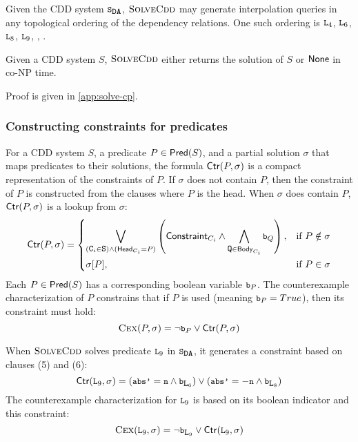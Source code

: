%
\begin{ex}
  Given the CDD system $\mcchc$, $\textsc{SolveCdd}$ may generate interpolation
  queries in any topological ordering of the dependency relations.
  One such ordering is $\cc{L}_4$, $\cc{L}_6$, $\cc{L}_8$, $\cc{L}_9$, ,
  .
\end{ex}

\begin{thm}
  \label{thm:solve-cp}
  Given a CDD system $S$, $\textsc{SolveCdd}$ either returns the solution of $S$ or $\mathsf{None}$
  in co-NP time.
\end{thm}
Proof is given in \autoref{app:solve-cp}.

%
\subsubsection{Constructing constraints for predicates}
%
For a CDD system $S$, a predicate $P \in \mathsf{Pred}( S )$, and a partial
solution $\sigma$ that maps predicates to their solutions, the formula
$\mathsf{Ctr}(P,\sigma)$ is a compact representation of the constraints of
$P$.
%
If $\sigma$ does not contain $P$, then the constraint of $P$ is
constructed from the clauses where $P$ is the head.  When $\sigma$
does contain $P$, $\mathsf{Ctr}(P,\sigma)$ is a lookup from $\sigma$:
%
\[
  \ctrof{P,\sigma}=
  \begin{dcases}
    \biglor_{(\cc{C}_i \in \cc{S}) \land (\headof{C_i} = P)}
    \left( \consof{C_i} \land %
      \bigland_{ \cc{Q} \in \bodyof{C_i}} \cc{b}_Q
    \right),
  &\text{if } P \notin \sigma\\
  \sigma[P], &\text{if } P \in \sigma
  \end{dcases}
\]
%
Each $P \in \mathsf{Pred}( S )$ has a corresponding boolean variable $\cc{b}_P$.
%
The counterexample characterization of $P$ constrains that if $P$ is used
(meaning $\cc{b}_{P} = True$), then its constraint must hold:
\[
  \vc{P,\sigma} = \neg \cc{b}_{P} \lor \ctrof{P,\sigma}
\]


\begin{ex}
  \label{ex:ctr}
  When $\textsc{SolveCdd}$ solves predicate $\cc{L}_9$ in $\mcchc$, it generates a
  constraint based on clauses (5) and (6):
  $$\ctrof{\cc{L}_9,\sigma} =
    (\cc{abs'} = \cc{n} \land \cc{b}_{\cc{L}_6})
    \lor
    (\cc{abs'} = -\cc{n} \land \cc{b}_{\cc{L}_8})$$
  The counterexample characterization for $\cc{L}_9$ is based on its boolean
  indicator and this constraint:
  $$\vc{\cc{L}_9,\sigma} = \neg \cc{b}_{\cc{L}_9} \lor \ctrof{\cc{L}_9,\sigma}$$
\end{ex}

